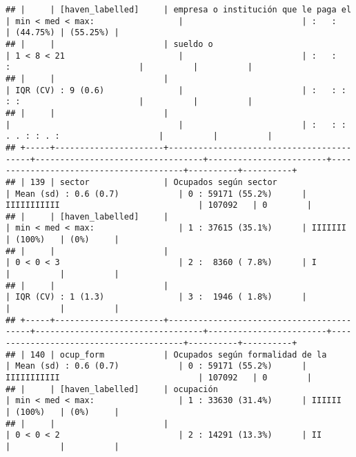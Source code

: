 \documentclass[]{article}
\begin{document}
\begin{verbatim}
## |     | [haven_labelled]     | empresa o institución que le paga el     | min < med < max:                 |                        | :   :                                  | (44.75%) | (55.25%) |
## |     |                      | sueldo o                                 | 1 < 8 < 21                       |                        | :   :       :                          |          |          |
## |     |                      |                                          | IQR (CV) : 9 (0.6)               |                        | :   : :     : :                        |          |          |
## |     |                      |                                          |                                  |                        | :   : : . . : : . :                    |          |          |
## +-----+----------------------+------------------------------------------+----------------------------------+------------------------+----------------------------------------+----------+----------+
## | 139 | sector               | Ocupados según sector                    | Mean (sd) : 0.6 (0.7)            | 0 : 59171 (55.2%)      | IIIIIIIIIII                            | 107092   | 0        |
## |     | [haven_labelled]     |                                          | min < med < max:                 | 1 : 37615 (35.1%)      | IIIIIII                                | (100%)   | (0%)     |
## |     |                      |                                          | 0 < 0 < 3                        | 2 :  8360 ( 7.8%)      | I                                      |          |          |
## |     |                      |                                          | IQR (CV) : 1 (1.3)               | 3 :  1946 ( 1.8%)      |                                        |          |          |
## +-----+----------------------+------------------------------------------+----------------------------------+------------------------+----------------------------------------+----------+----------+
## | 140 | ocup_form            | Ocupados según formalidad de la          | Mean (sd) : 0.6 (0.7)            | 0 : 59171 (55.2%)      | IIIIIIIIIII                            | 107092   | 0        |
## |     | [haven_labelled]     | ocupación                                | min < med < max:                 | 1 : 33630 (31.4%)      | IIIIII                                 | (100%)   | (0%)     |
## |     |                      |                                          | 0 < 0 < 2                        | 2 : 14291 (13.3%)      | II                                     |          |          |

\end{verbatim}
\end{document}
